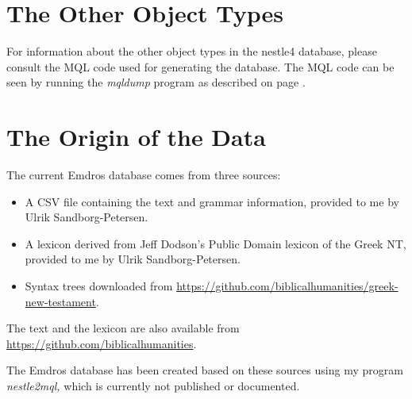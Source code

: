 \documentclass[11pt,oneside,a4paper]{memoir}
\begin{document}
\section{The Other Object Types}

For information about the other object types in the nestle4 database, please consult the MQL code
used for generating the database.  The MQL code can be seen by running the \emph{mqldump} program as
described on page \pageref{list-mqldump}.


\section{The Origin of the Data}

The current Emdros database comes from three sources:

\begin{itemize}
\item A CSV file containing the text and grammar information, provided to me by Ulrik
  Sandborg-Petersen.
\item A lexicon derived from Jeff Dodson's Public Domain lexicon of the Greek NT, provided to me by
  Ulrik Sandborg-Petersen.
\item Syntax trees downloaded from
  \url{https://github.com/biblicalhumanities/greek-new-testament}.
\end{itemize}

The text and the lexicon are also available from \url{https://github.com/biblicalhumanities}.

The Emdros database has been created based on these sources using my program \emph{nestle2mql,}
which is currently not published or documented.

\printindex
\end{document}

